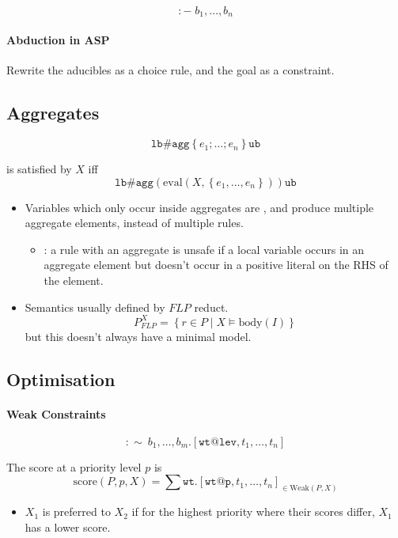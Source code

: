 \documentclass[twocolumn,english]{article}
\let\emph\relax
\begin{document}
\[
:-\;b_{1},\dots,b_{n}
\]

\paragraph{Abduction in ASP}

Rewrite the aducibles as a choice rule, and the goal as a constraint.

\subsection{Aggregates}

\[
\mathtt{lb\#agg}\left\{ e_{1};\dots;e_{n}\right\} \mathtt{ub}
\]

is satisfied by $X$ iff 
\[
\mathtt{lb\#agg}\left(\mathrm{eval}\left(X,\left\{ e_{1},\dots,e_{n}\right\} \right)\right)\mathtt{ub}
\]
\begin{itemize}
\item Variables which only occur inside aggregates are \emph{local}, and
produce multiple aggregate elements, instead of multiple rules. 
\begin{itemize}
\item \emph{Safety}: a rule with an aggregate is unsafe if a local variable
occurs in an aggregate element but doesn't occur in a positive literal
on the RHS of the element. 
\end{itemize}
\item Semantics usually defined by $FLP$ reduct. 
\[
P_{FLP}^{X}=\left\{ r\in P\mid X\vDash\text{body}\left(I\right)\right\} 
\]
but this doesn't always have a minimal model. 
\end{itemize}

\subsection{Optimisation}

\paragraph{Weak Constraints}

\[
:\sim\:b_{1},\dots,b_{m}.\left[\mathtt{wt@lev},t_{1},\dots,t_{n}\right]
\]

The score at a priority level $p$ is 
\[
\text{score}\left(P,p,X\right)=\sum\mathtt{wt}.\left[\mathtt{wt@p},t_{1},\dots,t_{n}\right]_{\in\text{Weak}\left(P,X\right)}
\]
\begin{itemize}
\item $X_{1}$ is preferred to $X_{2}$ if for the highest priority where
their scores differ, $X_{1}$ has a lower score. 
\end{itemize}
\end{document}
